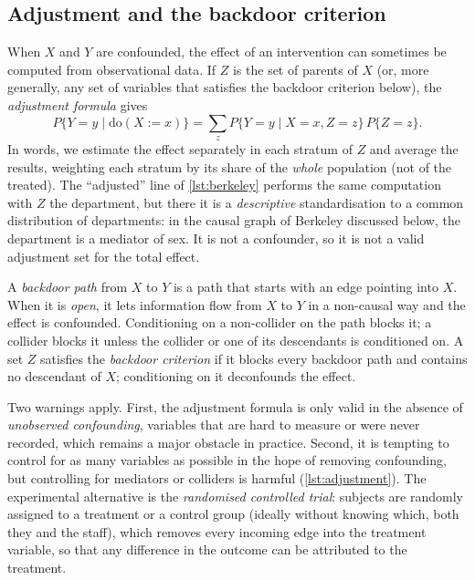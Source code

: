 \subsection{Adjustment and the backdoor criterion}\label{sec:adjustment}

When $X$ and $Y$ are confounded, the effect of an intervention can sometimes be computed from
observational data. If $Z$ is the set of parents of $X$ (or, more generally, any set of variables
that satisfies the backdoor criterion below), the \emph{adjustment formula} gives
\begin{equation}\label{eq:adjustment}
  P\{Y=y\mid\mathrm{do}(X:=x)\}=\sum_{z}P\{Y=y\mid X=x,Z=z\}\,P\{Z=z\}.
\end{equation}
In words, we estimate the effect separately in each stratum of $Z$ and average the results,
weighting each stratum by its share of the \emph{whole} population (not of the treated). The
``adjusted'' line of \cref{lst:berkeley} performs the same computation with $Z$ the department, but there
it is a \emph{descriptive} standardisation to a common distribution of departments: in the causal graph
of Berkeley discussed below, the department is a mediator of sex. It is not a confounder, so it is not a valid
adjustment set for the total effect.

A \emph{backdoor path} from $X$ to $Y$ is a path that starts with an edge pointing into $X$. When it is
\emph{open}, it lets information flow from $X$ to $Y$ in a non-causal way and the effect is confounded.
Conditioning on a non-collider on the path blocks it; a collider blocks it unless the collider or one
of its descendants is conditioned on. A set $Z$ satisfies the \emph{backdoor criterion} if it blocks every backdoor
path and contains no descendant of $X$; conditioning on it deconfounds the effect.

Two warnings apply. First, the adjustment formula is only valid in the absence of
\emph{unobserved confounding}, variables that are hard to measure or were never recorded, which
remains a major obstacle in practice. Second, it is tempting to control for as many variables as
possible in the hope of removing confounding, but controlling for mediators or colliders is
harmful (\cref{lst:adjustment}). The experimental alternative is the \emph{randomised controlled
trial}: subjects are randomly assigned to a treatment or a control group (ideally without knowing
which, both they and the staff), which removes every incoming edge into the treatment variable, so
that any difference in the outcome can be attributed to the treatment.

